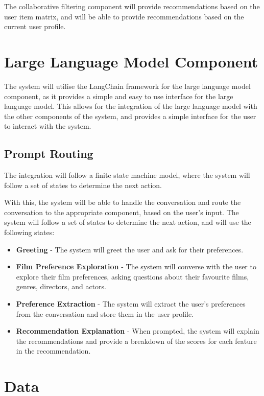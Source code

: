 The collaborative filtering component will provide recommendations based on the user item matrix, and will be able to provide recommendations based on the current user profile.

\section{Large Language Model Component}
\label{sec:llm_component_design}
The system will utilise the LangChain framework \cite{langchain} for the large language model component, as it provides a simple and easy to use interface for the large language model.
This allows for the integration of the large language model with the other components of the system, and provides a simple interface for the user to interact with the system.

\subsection{Prompt Routing}
\label{sec:prompt_routing_design}
The integration will follow a finite state machine model, where the system will follow a set of states to determine the next action.

With this, the system will be able to handle the conversation and route the conversation to the appropriate component, based on the user's input.
The system will follow a set of states to determine the next action, and will use the following states:
\begin{itemize}
    \item \textbf{Greeting} - The system will greet the user and ask for their preferences.
    \item \textbf{Film Preference Exploration} - The system will converse with the user to explore their film preferences, asking questions about their favourite films, genres, directors, and actors.
    \item \textbf{Preference Extraction} - The system will extract the user's preferences from the conversation and store them in the user profile.
    \item \textbf{Recommendation Explanation} - When prompted, the system will explain the recommendations and provide a breakdown of the scores for each feature in the recommendation.
\end{itemize}

\section{Data}
\label{sec:data_design}
